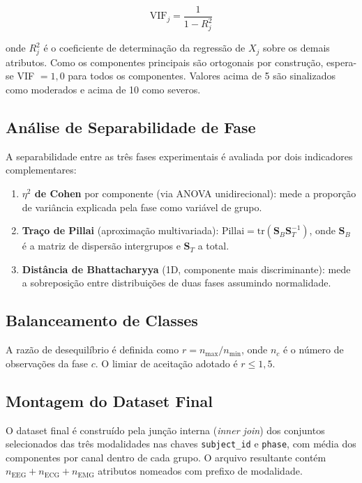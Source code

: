 \begin{equation}
    \text{VIF}_j = \frac{1}{1 - R^2_j}
    \label{eq:vif}
\end{equation}

\noindent onde $R^2_j$ é o coeficiente de determinação da regressão de $X_j$ sobre os demais atributos. Como os componentes principais são ortogonais por construção, espera-se VIF $= 1{,}0$ para todos os componentes. Valores acima de 5 são sinalizados como moderados e acima de 10 como severos.

\subsection{Análise de Separabilidade de Fase}

A separabilidade entre as três fases experimentais é avaliada por dois indicadores complementares:

\begin{enumerate}
    \item \textbf{$\eta^2$ de Cohen} por componente (via ANOVA unidirecional): mede a proporção de variância explicada pela fase como variável de grupo.
    \item \textbf{Traço de Pillai} (aproximação multivariada): $\text{Pillai} = \text{tr}\left(\mathbf{S}_B \mathbf{S}_T^{-1}\right)$, onde $\mathbf{S}_B$ é a matriz de dispersão intergrupos e $\mathbf{S}_T$ a total.
    \item \textbf{Distância de Bhattacharyya} (1D, componente mais discriminante): mede a sobreposição entre distribuições de duas fases assumindo normalidade.
\end{enumerate}

\subsection{Balanceamento de Classes}

A razão de desequilíbrio é definida como $r = n_{\max}/n_{\min}$, onde $n_c$ é o número de observações da fase $c$. O limiar de aceitação adotado é $r \leq 1{,}5$.

\subsection{Montagem do Dataset Final}

O dataset final é construído pela junção interna (\textit{inner join}) dos conjuntos selecionados das três modalidades nas chaves \texttt{subject\_id} e \texttt{phase}, com média dos componentes por canal dentro de cada grupo. O arquivo resultante contém $n_{\text{EEG}} + n_{\text{ECG}} + n_{\text{EMG}}$ atributos nomeados com prefixo de modalidade.

